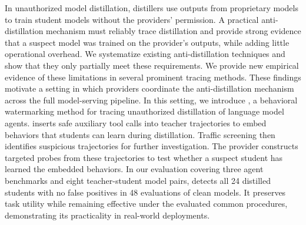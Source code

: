 In unauthorized model distillation, distillers use outputs from proprietary models to train student models without the providers' permission.
A practical anti-distillation mechanism must reliably trace distillation and provide strong evidence that a suspect model was trained on the provider's outputs, while adding little operational overhead.
We systematize existing anti-distillation techniques and show that they only partially meet these requirements.
We provide new empirical evidence of these limitations in several prominent tracing methods.
These findings motivate a setting in which providers coordinate the anti-distillation mechanism across the full model-serving pipeline.
In this setting, we introduce \name{}, a behavioral watermarking method for tracing unauthorized distillation of language model agents.
\name{} inserts safe auxiliary tool calls into teacher trajectories to embed behaviors that students can learn during distillation.
Traffic screening then identifies suspicious trajectories for further investigation.
The provider constructs targeted probes from these trajectories to test whether a suspect student has learned the embedded behaviors.
In our evaluation covering three agent benchmarks and eight teacher-student model pairs,
\name{} detects all 24 distilled students with no false positives in 48 evaluations of clean models.
It preserves task utility while remaining effective under the evaluated common procedures, demonstrating its practicality in real-world deployments.
